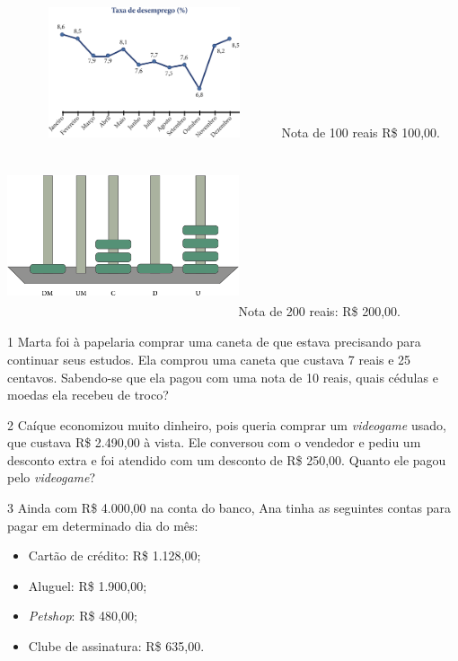 \begin{mdframed}[linewidth=2pt,linecolor=salmao,roundcorner=2pt]
{\includegraphics[width=3.18285in,height=1.50833in]{media/image79.png}Nota
de 100 reais R\$ 100,00.

\includegraphics[width=2.68333in,height=1.88913in]{media/image80.png}Nota
de 200 reais: R\$ 200,00.
}


\num{1} Marta foi à papelaria comprar uma caneta de que estava precisando para
continuar seus estudos. Ela comprou uma caneta que custava 7 reais e 25
centavos. Sabendo-se que ela pagou com uma nota de 10 reais, quais
cédulas e moedas ela recebeu de troco?


\num{2} Caíque economizou muito dinheiro, pois queria comprar um \textit{videogame} usado,
que custava R\$ 2.490,00 à vista. Ele conversou com o vendedor e pediu
um desconto extra e foi atendido com um desconto de R\$ 250,00. Quanto
ele pagou pelo \textit{videogame}?


\num{3} Ainda com R\$ 4.000,00 na conta do banco, Ana tinha as seguintes contas para pagar em determinado dia do mês:

\begin{mdframed}[linewidth=2pt,linecolor=azul!20,backgroundcolor=azul!20,roundcorner=2pt]
\begin{itemize}
  \item Cartão de crédito: R\$ 1.128,00;
  \item Aluguel: R\$ 1.900,00;
  \item \textit{Petshop}: R\$ 480,00;
  \item Clube de assinatura: R\$ 635,00.
\end{itemize}
\end{mdframed}


\end{mdframed}
